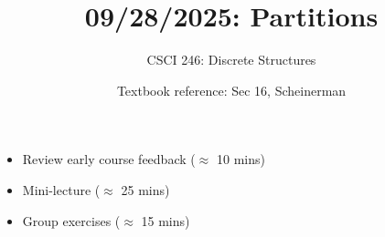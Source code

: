 \documentclass[10pt]{beamer}
\begin{document}






\title{09/28/2025: Partitions}
\author{CSCI 246: Discrete Structures}
\date{Textbook reference: Sec 16, Scheinerman}

\begin{frame}
    \titlepage 
\end{frame}


\begin{frame}

%
%
%
%
%


\begin{myyellowbox}[title=Today's Agenda]
\begin{itemize}
	\item Review early course feedback ($\approx$ 10 mins)
	\item Mini-lecture ($\approx$ 25 mins)
	\item Group exercises ($\approx$ 15 mins)
\end{itemize}

%	
\end{myyellowbox}
\vfill 

\end{frame}
\end{document}
